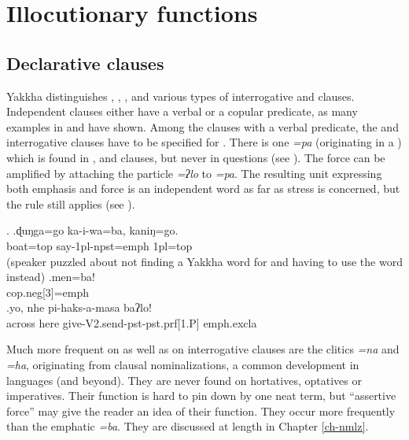 \section{Illocutionary functions}\label{simp-cl3}
 

\subsection{Declarative clauses }
 Yakkha distinguishes , , , and various types of interrogative and  clauses.
 Independent  clauses either have a verbal or a copular predicate, as many examples in   and  have shown. Among the clauses with a verbal predicate, the  and interrogative clauses have to be specified for . There is one  \emph{=pa} (originating in a ) which is found in ,  and   clauses, but never in questions (see \Next). The  force can be amplified by attaching the  particle \emph{=ʔlo} to \emph{=pa}. The resulting unit expressing both emphasis and  force is an independent word as far as stress is concerned, but the  rule still applies (see \Next[c]). 
 
 \ex. \ag.ɖuŋga=go     ka-i-wa=ba,               kaniŋ=go.\\
 boat{\sc =top} say{\sc -1pl-npst=emph} {\sc 1pl=top}\\
  (speaker puzzled about not finding a Yakkha word for  and having to use the  word instead) 
 \bg.men=ba!\\
 {\sc cop.neg[3]=emph}\\
 \bg.yo,   nhe  pi-haks-a-masa       baʔlo!\\
 across here give{\sc -V2.send-pst-pst.prf[1.P]} {\sc emph.excla}\\
  
 
Much more frequent on  as well as on interrogative clauses are the clitics \emph{=na} and \emph{=ha}, originating from clausal nominalizations, a common development in  languages (and beyond). They are never found on hortatives, optatives or imperatives. Their function is hard to pin down by one neat term, but “assertive force” may give the reader an idea of their function. They occur more frequently than the emphatic \emph{=ba}. They are discussed at length in Chapter \ref{ch-nmlz}. 

